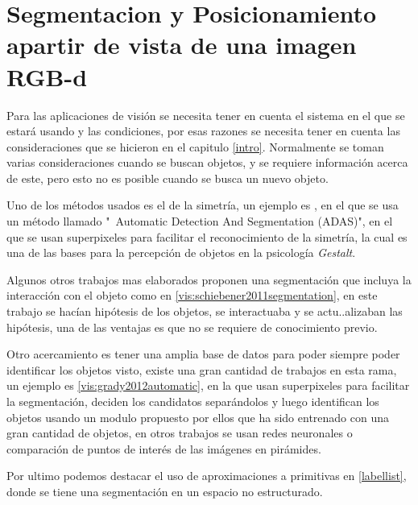     \chapter{Segmentacion y Posicionamiento apartir de vista de una imagen RGB-d}
    
    Para las aplicaciones de visión se necesita tener en cuenta el sistema en el que se estará usando y las condiciones, por esas razones se necesita tener en cuenta las consideraciones que se hicieron en el capitulo \ref{intro}. Normalmente se toman varias consideraciones cuando se buscan objetos, y se requiere información acerca de este, pero esto no es posible cuando se busca un nuevo objeto.
    
    Uno de los métodos usados es el de la simetría, un ejemplo es \cite{vis:kootstra2010fast}, en el que se usa un método llamado "\ Automatic Detection And Segmentation (ADAS)", en el que se usan superpixeles para facilitar el reconocimiento de la simetría, la cual es una de las bases para la percepción de objetos en la psicología \textit{Gestalt}.
    
    Algunos otros trabajos mas elaborados proponen una segmentación que incluya la interacción con el objeto como en \cref{vis:schiebener2011segmentation}, en este trabajo se hacían hipótesis de los objetos, se interactuaba y se actu..alizaban las hipótesis, una de las ventajas es que no se requiere de conocimiento previo.
    
    Otro acercamiento es tener una amplia base de datos para poder siempre poder identificar los objetos visto, existe una gran cantidad de trabajos en esta rama, un ejemplo es \cref{vis:grady2012automatic}, en la que usan superpixeles para facilitar la segmentación, deciden los candidatos separándolos y luego identifican los objetos usando un modulo propuesto por ellos que ha sido entrenado con una gran cantidad de objetos, en otros trabajos se usan redes neuronales o comparación de puntos de interés de las imágenes en pirámides.
    
    Por ultimo podemos destacar el uso de aproximaciones a primitivas en \ref{labellist}, donde se tiene una segmentación en un espacio no estructurado.
    
    

